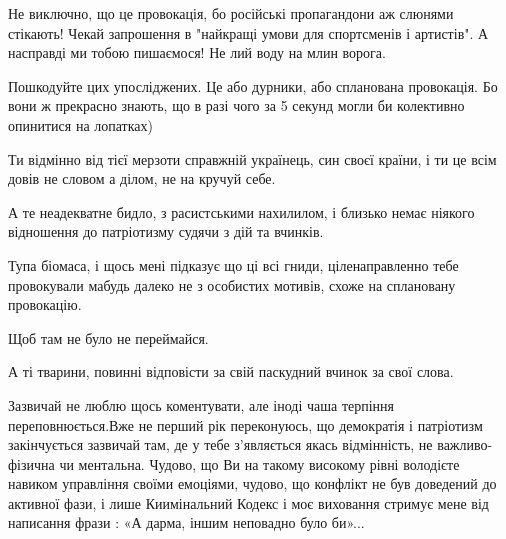 \begin{itemize}
Не виключно, що це провокація, бо російські пропагандони аж слюнями стікають!
Чекай запрошення в "найкращі умови для спортсменів і артистів". А насправді ми
тобою пишаємося! Не лий воду на млин ворога.


 

Пошкодуйте цих упосліджених. Це або дурники, або спланована провокація. Бо вони
ж прекрасно знають, що в разі чого за 5 секунд могли би колективно опинитися на
лопатках)


 

Ти відмінно від тієї мерзоти справжній українець, син своєї країни, і ти це всім
довів не словом а ділом, не на кручуй себе.

А те неадекватне бидло, з расистськими нахилилом, і близько немає ніякого
відношення до патріотизму судячи з дій та вчинків.

Тупа біомаса, і щось мені підказує що ці всі гниди, ціленаправленно тебе
провокували мабудь далеко не з особистих мотивів, схоже на сплановану
провокацію.

Щоб там не було не переймайся.

А ті тварини, повинні відповісти за свій паскудний вчинок за свої слова.

 

Зазвичай не люблю щось коментувати, але іноді чаша терпіння переповнюється.Вже
не перший рік переконуюсь, що демократія і патріотизм закінчується зазвичай
там, де у тебе з’являється якась відмінність, не важливо-фізична чи ментальна.
Чудово, що Ви на такому високому рівні володієте навиком управління своїми
емоціями, чудово, що конфлікт не був доведений до активної фази, і лише
Киимінальний Кодекс і моє виховання стримує мене від написання фрази : «А
дарма, іншим неповадно було би»...



\end{itemize}
